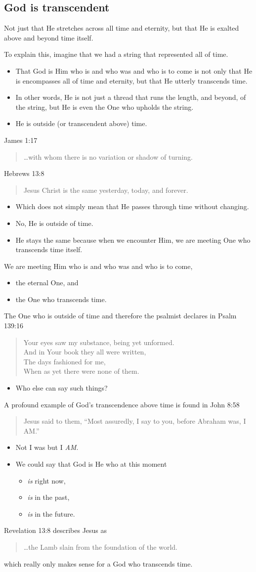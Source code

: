 \documentclass[12pt]{article}
\newcommand{\BI}{\begin{itemize}}
\newcommand{\EI}{\end{itemize}}
\newcommand{\I}{\item}
\newcommand{\Q}[1]{\begin{quote} #1 \end{quote}}
\begin{document}
\subsection{God is transcendent}
\I  Not just that He stretches across all time and eternity,
    but that He is exalted above and beyond time itself.
\I  To explain this, imagine that we had a string that represented all of time.
\BI \I  That God is Him who is and who was and who is to come is not only that He is encompasses all of time and eternity,
        but that He utterly transcends time.
    \I  In other words, He is not just a thread that runs the length, and beyond, of the string,
        but He is even the One who upholds the string. 
    \I  He is outside (or transcendent above) time. \EI
\I  James 1:17 \Q{\ldots with whom there is no variation or shadow of turning.}
\I  Hebrews 13:8 \Q{Jesus Christ is the same yesterday, today, and forever.}
\BI \I  Which does not simply mean that He passes through time without changing.
    \I  No, He is outside of time.
    \I  He stays the same because when we encounter Him, we are meeting One who transcends time itself. \EI
\I  We are meeting Him who is and who was and who is to come,
\BI \I  the eternal One, and
    \I  the One who transcends time. \EI
\I  The One who is outside of time and therefore the psalmist declares in Psalm 139:16
    \Q{Your eyes saw my substance, being yet unformed. \\
        And in Your book they all were written, \\
        The days fashioned for me, \\
        When as yet there were none of them.}
\BI \I  Who else can say such things? \EI
\I  A profound example of God's transcendence above time is found in John 8:58
    \Q{Jesus said to them, ``Most assuredly, I say to you, before Abraham was, I AM.''}
\BI \I  Not I was but I \emph{AM}.
    \I  We could say that God is He who at this moment 
    \BI \I  \emph{is} right now,
        \I  \emph{is} in the past,
        \I  \emph{is} in the future. \EI
        \EI
\I  Revelation 13:8 describes Jesus as
    \Q{\ldots the Lamb slain from the foundation of the world.}
    which really only makes sense for a God who transcends time.
\end{document}
